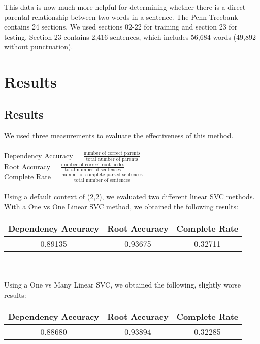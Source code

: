 \documentclass[12pt,fleqn]{article}
\begin{document}
This data is now much more helpful for determining whether there is a direct parental relationship between two words in a sentence. The Penn Treebank contains 24 sections. We used sections 02-22 for training and section 23 for testing. Section 23 contains 2,416 sentences, which includes 56,684 words (49,892 without punctuation).


\section{Results}
\subsection{Results}
We used three measurements to evaluate the effectiveness of this method.\\

\noindent \\
Dependency Accuracy = $\frac{\text{number of correct parents}}{\text{total number of parents}}$\\
Root Accuracy = $\frac{\text{number of correct root nodes}}{\text{total number of sentences}}$\\
Complete Rate  = $\frac{\text{number of complete parsed sentences}}{\text{total number of sentences}}$\\

\noindent \\
Using a default context of (2,2), we evaluated two different linear SVC methods. With a One vs One Linear SVC method, we obtained the following results:\\
        \begin{tabular}{|c|c|c|}
            \hline Dependency Accuracy & Root Accuracy & Complete Rate \\ \hline
            0.89135 & 0.93675 & 0.32711 \\ \hline
        \end{tabular}\\

\noindent \\
Using a One vs Many Linear SVC, we obtained the following, slightly worse results: \\
       \begin{tabular}{|c|c|c|}
            \hline Dependency Accuracy & Root Accuracy & Complete Rate \\ \hline
            0.88680 & 0.93894 & 0.32285 \\ \hline
        \end{tabular} \\
        
\end{document}
